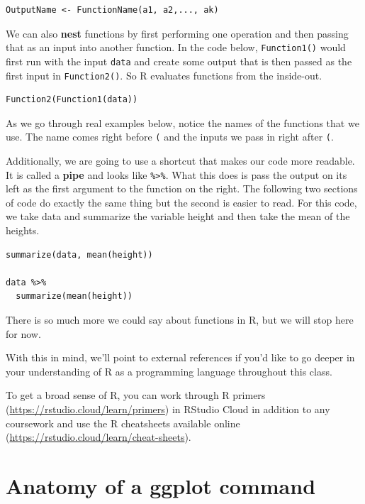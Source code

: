 \documentclass[]{book}
\begin{document}
\begin{verbatim}
OutputName <- FunctionName(a1, a2,..., ak)
\end{verbatim}

We can also \textbf{nest} functions by first performing one operation and then passing that as an input into another function. In the code below, \texttt{Function1()} would first run with the input \texttt{data} and create some output that is then passed as the first input in \texttt{Function2()}. So R evaluates functions from the inside-out.

\begin{verbatim}
Function2(Function1(data))
\end{verbatim}

As we go through real examples below, notice the names of the functions that we use. The name comes right before \texttt{(} and the inputs we pass in right after \texttt{(}.

Additionally, we are going to use a shortcut that makes our code more readable. It is called a \textbf{pipe} and looks like \texttt{\%\textgreater{}\%}. What this does is pass the output on its left as the first argument to the function on the right. The following two sections of code do exactly the same thing but the second is easier to read. For this code, we take data and summarize the variable height and then take the mean of the heights.

\begin{verbatim}
summarize(data, mean(height))

data %>%
  summarize(mean(height))
\end{verbatim}

There is so much more we could say about functions in R, but we will stop here for now.

With this in mind, we'll point to external references if you'd like to go deeper in your understanding of R as a programming language throughout this class.

To get a broad sense of R, you can work through R primers (\url{https://rstudio.cloud/learn/primers}) in RStudio Cloud in addition to any coursework and use the R cheatsheets available online (\url{https://rstudio.cloud/learn/cheat-sheets}).

\hypertarget{anatomy-of-a-ggplot-command}{%
\section{Anatomy of a ggplot command}\label{anatomy-of-a-ggplot-command}}
\end{document}
